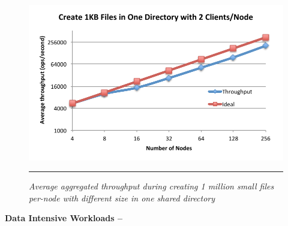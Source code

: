 \begin{figure}[t]  %
\centerline{\includegraphics[scale=0.6]{./figs/hdfs_small_file}}
\vspace{10pt}
\caption{
\textit{Average aggregated throughput during creating 1 million small files
per-node with different size in one shared directory}
}
\hrule
\label{graph:smallfiles}
\end{figure}       %


\textbf{Data Intensive Workloads -- }

